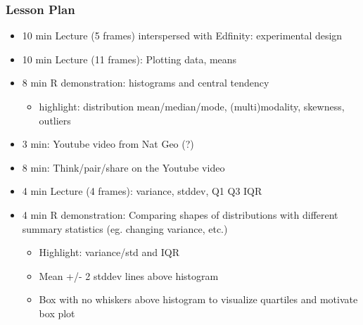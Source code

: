 \begin{frame}
    \frametitle{Lesson Plan}
    \begin{itemize}
        \item 10 min Lecture (5 frames) interspersed with Edfinity: experimental design
        \item 10 min Lecture (11 frames): Plotting data, means
        \item 8 min R demonstration: histograms and central tendency
        \begin{itemize}
            \item  highlight: distribution mean/median/mode, (multi)modality, skewness, outliers
        \end{itemize}
        \item 3 min: Youtube video from Nat Geo (?)
        \item 8 min: Think/pair/share on the Youtube video
        \item 4 min Lecture (4 frames): variance, stddev, Q1 Q3 IQR
        \item 4 min R demonstration: Comparing shapes of distributions with different summary statistics (eg. changing variance, etc.)
        \begin{itemize}
            \item Highlight: variance/std and IQR
            \item Mean +/- 2 stddev lines above histogram
            \item Box with no whiskers above histogram to visualize quartiles and motivate box plot
         \end{itemize}
     \end{itemize}
\end{frame}

